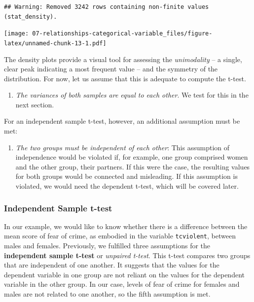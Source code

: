 \documentclass[
]{book}
\providecommand{\tightlist}{%
  \setlength{\itemsep}{0pt}\setlength{\parskip}{0pt}}
\begin{document}
\begin{verbatim}
## Warning: Removed 3242 rows containing non-finite values (stat_density).
\end{verbatim}

\texttt{[image: 07-relationships-categorical-variable\_files/figure-latex/unnamed-chunk-13-1.pdf]}

The density plots provide a visual tool for assessing the \emph{unimodality} -- a single, clear peak indicating a most frequent value -- and the symmetry of the distribution. For now, let us assume that this is adequate to compute the t-test.

\begin{enumerate}
\def\labelenumi{\arabic{enumi}.}
\setcounter{enumi}{3}
\tightlist
\item
  \emph{The variances of both samples are equal to each other}. We test for this in the next section.
\end{enumerate}

For an independent sample t-test, however, an additional assumption must be met:

\begin{enumerate}
\def\labelenumi{\arabic{enumi}.}
\setcounter{enumi}{4}
\tightlist
\item
  \emph{The two groups must be independent of each other}: This assumption of independence would be violated if, for example, one group comprised women and the other group, their partners. If this were the case, the resulting values for both groups would be connected and misleading. If this assumption is violated, we would need the dependent t-test, which will be covered later.
\end{enumerate}

\hypertarget{independent-sample-t-test}{%
\subsubsection{Independent Sample t-test}\label{independent-sample-t-test}}

In our example, we would like to know whether there is a difference between the mean score of fear of crime, as embodied in the variable \texttt{tcviolent}, between males and females. Previously, we fulfilled three assumptions for the \textbf{independent sample t-test} or \emph{unpaired t-test}. This t-test compares two groups that are independent of one another. It suggests that the values for the dependent variable in one group are not reliant on the values for the dependent variable in the other group. In our case, levels of fear of crime for females and males are not related to one another, so the fifth assumption is met.
\end{document}

